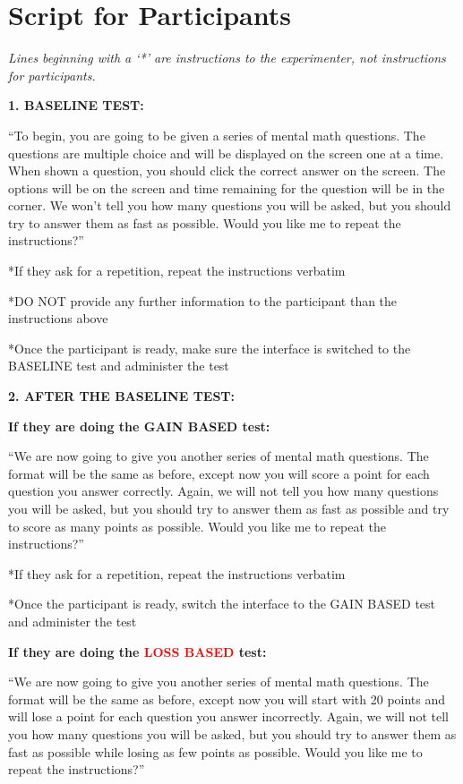 \documentclass[12pt]{exam}
\begin{document}
\section{Script for Participants}
\label{appdx:script}
\textit{Lines beginning with a ‘*’ are instructions to the experimenter, not instructions for participants.}

\textbf{1. BASELINE TEST:}

“To begin, you are going to be given a series of mental math questions. The questions are multiple choice and will be displayed on the screen one at a time. When shown a question, you should click the correct answer on the screen. The options will be on the screen and time remaining for the question will be in the corner. We won’t tell you how many questions you will be asked, but you should try to answer them as fast as possible. Would you like me to repeat the instructions?” 

*If they ask for a repetition, repeat the instructions verbatim

*DO NOT provide any further information to the participant than the instructions above

*Once the participant is ready, make sure the interface is switched to the BASELINE test and administer the test

\textbf{2. AFTER THE BASELINE TEST:}

\textbf{If they are doing the \textcolor{readablegreen}{GAIN BASED} test:}

“We are now going to give you another series of mental math questions. The format will be the same as before, except now you will score a point for each question you answer correctly. Again, we will not tell you how many questions you will be asked, but you should try to answer them as fast as possible and try to score as many points as possible. Would you like me to repeat the instructions?”

*If they ask for a repetition, repeat the instructions verbatim

*Once the participant is ready, switch the interface to the GAIN BASED test and administer the test

\textbf{If they are doing the \textcolor{red}{LOSS BASED} test:}

“We are now going to give you another series of mental math questions. The format will be the same as before, except now you will start with 20 points and will lose a point for each question you answer incorrectly. Again, we will not tell you how many questions you will be asked, but you should try to answer them as fast as possible while losing as few points as possible. Would you like me to repeat the instructions?”
\end{document}

